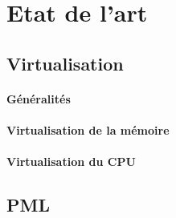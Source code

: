 \let\textcircled=\pgftextcircled
\chapter{Etat de l'art}
\label{chap:etat_de_lart}

\minitoc

\newpage    
\section{Virtualisation}

\subsubsection{Généralités}

\subsubsection{Virtualisation de la mémoire}

\subsubsection{Virtualisation du CPU}

\section{PML}